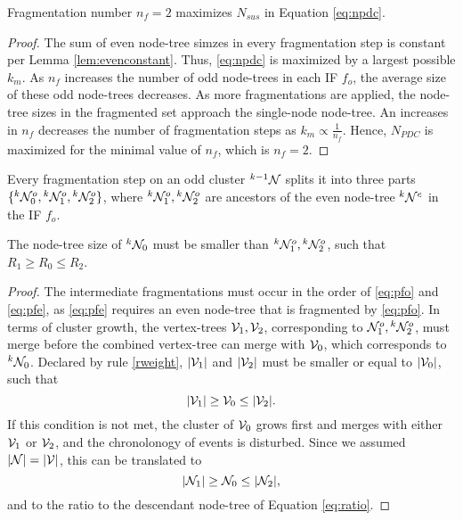 \begin{theorem}\label{the:fragnumber}
  Fragmentation number $n_f=2$ maximizes $N_{sus}$ in Equation \eqref{eq:npdc}.
\end{theorem}
\begin{proof}
  The sum of even node-tree simzes in every fragmentation step is constant per Lemma \ref{lem:evenconstant}. Thus, \eqref{eq:npdc} is maximized by a largest possible $k_m$.  As $n_f$ increases the number of odd node-trees in each IF $f_o$, the average size of these odd node-trees decreases. As more fragmentations are applied, the node-tree sizes in the fragmented set approach the single-node node-tree. An increases in $n_f$ decreases the number of fragmentation steps as $ k_m \propto \frac{1}{n_f}$.  Hence, $N_{PDC}$ is maximized for the minimal value of $n_f$, which is $n_f = 2$.
\end{proof}

Every fragmentation step on an odd cluster ${}^{k-1}\mathcal{N}$ splits it into three parts $\{{}^{k}\mathcal{N}^o_0, {}^{k}\mathcal{N}^o_1, {}^{k}\mathcal{N}^o_2\}$, where ${}^{k}\mathcal{N}^o_1, {}^{k}\mathcal{N}^o_2$ are ancestors of the even node-tree ${}^{k}\mathcal{N}^e$ in the IF $f_o$. 

\begin{lemma}\label{lem:chrono}
  The node-tree size of ${}^{k}\mathcal{N}_0$ must be smaller than ${}^{k}\mathcal{N}^o_1, {}^{k}\mathcal{N}^o_2$, such that $R_1 \geq R_0 \leq R_2$. 
\end{lemma}
\begin{proof}
  The intermediate fragmentations must occur in the order of \eqref{eq:pfo} and \eqref{eq:pfe}, as \eqref{eq:pfe} requires an even node-tree that is fragmented by \eqref{eq:pfo}. In terms of cluster growth, the vertex-trees $\mathcal{V}_1, \mathcal{V}_2$, corresponding to $\mathcal{N}^o_1, {}^{k}\mathcal{N}^o_2$, must merge before the combined vertex-tree can merge with $\mathcal{V}_0$, which corresponds to ${}^{k}\mathcal{N}_0$. Declared by rule \ref{rweight}, $\lvert\mathcal{V}_1\rvert$ and $\lvert\mathcal{V}_2\rvert$ must be smaller or equal to $\lvert\mathcal{V}_0\rvert$, such that 
  \begin{equation*}
    \lvert\mathcal{V}_1\rvert\geq \mathcal{V}_0 \leq\lvert\mathcal{V}_2\rvert.
  \end{equation*}
  If this condition is not met, the cluster of $\mathcal{V}_0$ grows first and merges with either $\mathcal{V}_1$ or $\mathcal{V}_2$, and the chronolonogy of events is disturbed. Since we assumed $\lvert\mathcal{N}\rvert=\lvert\mathcal{V}\rvert$, this can be translated to 
  \begin{equation*}
    \lvert\mathcal{N}_1\rvert\geq \mathcal{N}_0 \leq\lvert\mathcal{N}_2\rvert,
  \end{equation*}
  and to the ratio to the descendant node-tree of Equation \eqref{eq:ratio}.
\end{proof}

